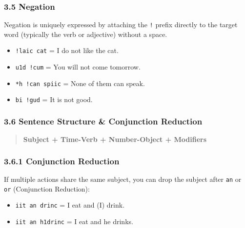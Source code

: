 \subsubsection{3.5 Negation}\label{negation}

Negation is uniquely expressed by attaching the \texttt{!} prefix
directly to the target word (typically the verb or adjective) without a
space.

\begin{itemize}
\tightlist
\item
  \texttt{!laic\ cat} = I do not like the cat.
\item
  \texttt{u1d\ !cum} = You will not come tomorrow.
\item
  \texttt{*h\ !can\ spiic} = None of them can speak.
\item
  \texttt{bi\ !gud} = It is not good.
\end{itemize}

\subsubsection{3.6 Sentence Structure \& Conjunction
Reduction}\label{sentence-structure-conjunction-reduction}

\begin{quote}
\textbf{Subject + Time-Verb + Number-Object + Modifiers}
\end{quote}

\begin{Shaded}
\begin{Highlighting}[]
\end{Highlighting}
\end{Shaded}

\subsubsection{3.6.1 Conjunction Reduction}\label{conjunction-reduction}

If multiple actions share the same subject, you can drop the subject
after \texttt{an} or \texttt{or} (Conjunction Reduction):

\begin{itemize}
\tightlist
\item
  \texttt{iit\ an\ drinc} = I eat and (I) drink.
\item
  \texttt{iit\ an\ h1drinc} = I eat and he drinks.
\end{itemize}

